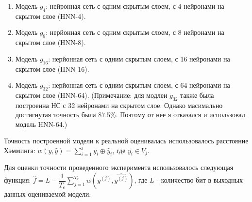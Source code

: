 \documentclass[a4paper,12pt,twoside]{article}
\begin{document}
	\begin{enumerate}
		\item Модель $g_4$: нейронная сеть с одним скрытым слоем, с 4 нейронами на скрытом слое (HNN-4).
		\item Модель $g_8$: нерйонная сеть с одним скрытым слоем, с 8 нейронами на скрытом слое (HNN-8).
		\item Модель $g_{16}$: нерйонная сеть с одним скрытым слоем, с 16 нейронами на скрытом слое (HNN-16).
		\item Модель $g_{32}$: нерйонная сеть с одним скрытым слоем, с 64 нейронами на скрытом слое (HNN-64).
		(Примечание: для модлеи $g_{32}$ также была построенна НС с 32 нейронами на скрытом слое. Однако масимально достигнутая точность была 87.5\%. Поэтому от нее я отказался и использовал модель HNN-64.)
	\end{enumerate}
	

	\noindent Точность построенной модели к реальной оценивалась использовалось расстояние Хэмминга:
	$w(y, \hat{y}) = \sum_{i=1}^{j} y_i \oplus \hat{y}_i$, где $y_i \in V_j$.
	\bigskip
	
	\noindent Для оценки точности проведенного эксперимента использовалось следующая функция:
	$\hat{f} =L - \dfrac{1}{T_e}\sum_{j=1}^{T_e}w(y^{(j)}, \hat{y^{(j)}})$,
	где $L$ - количество бит в выходных данных оцениваемой модели. 
\end{document}
